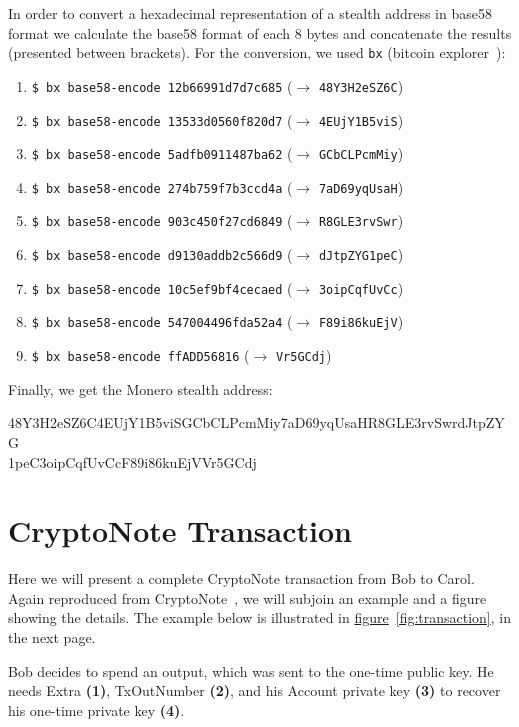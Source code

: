 In order to convert a hexadecimal representation of a stealth address in base58 format we calculate the base58 format of each 8 bytes and concatenate the results (presented between brackets). For the conversion, we used \verb|bx| (bitcoin explorer~\cite{bx}):

\begin{enumerate}
  \item \verb|$ bx base58-encode 12b66991d7d7c685| ($\rightarrow$ \verb|48Y3H2eSZ6C|)
  \item \verb|$ bx base58-encode 13533d0560f820d7| ($\rightarrow$ \verb|4EUjY1B5viS|)
  \item \verb|$ bx base58-encode 5adfb0911487ba62| ($\rightarrow$ \verb|GCbCLPcmMiy|)
  \item \verb|$ bx base58-encode 274b759f7b3ccd4a| ($\rightarrow$ \verb|7aD69yqUsaH|)
  \item \verb|$ bx base58-encode 903c450f27cd6849| ($\rightarrow$ \verb|R8GLE3rvSwr|)
  \item \verb|$ bx base58-encode d9130addb2c566d9| ($\rightarrow$ \verb|dJtpZYG1peC|)
  \item \verb|$ bx base58-encode 10c5ef9bf4cecaed| ($\rightarrow$ \verb|3oipCqfUvCc|)
  \item \verb|$ bx base58-encode 547004496fda52a4| ($\rightarrow$ \verb|F89i86kuEjV|)
  \item \verb|$ bx base58-encode ffADD56816| ($\rightarrow$ \verb|Vr5GCdj|)
\end{enumerate}

Finally, we get the Monero stealth address:
\begin{tcolorbox}[colback=green!5!white,colframe=green!65!black]
  \small{48Y3H2eSZ6C4EUjY1B5viSGCbCLPcmMiy7aD69yqUsaHR8GLE3rvSwrdJtpZYG\\
  1peC3oipCqfUvCcF89i86kuEjVVr5GCdj}
\end{tcolorbox}

\section{CryptoNote Transaction} \label{sec:cryptonote_transaction}
%
Here we will present a complete CryptoNote transaction from Bob to Carol. Again reproduced from CryptoNote~\cite{cryptonote}, we will subjoin an example and a figure showing the details. The example below is illustrated in \hyperref[fig:transaction]{figure}~\ref{fig:transaction}, in the next page.

Bob decides to spend an output, which was sent to the one-time public key. He needs Extra \textbf{(1)}, TxOutNumber \textbf{(2)}, and his Account private key \textbf{(3)} to recover his one-time private key \textbf{(4)}.

